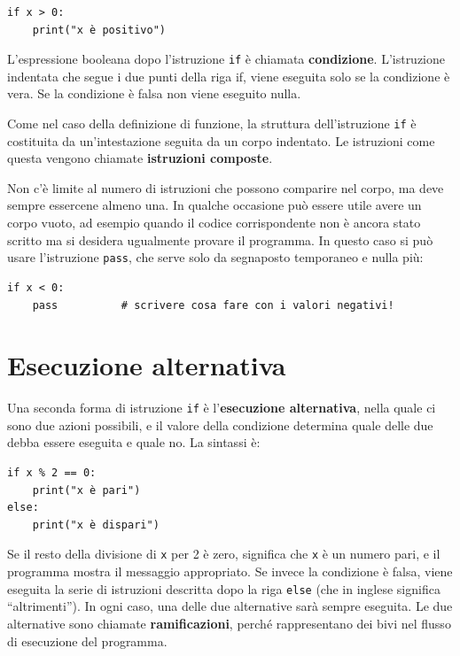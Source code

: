 \documentclass[10pt]{book}
\begin{document}
\begin{verbatim}
if x > 0:
    print("x è positivo")
\end{verbatim}
%
L'espressione booleana dopo l'istruzione {\tt if} è chiamata {\bf condizione}.  L'istruzione indentata che segue i due punti della riga if, viene eseguita solo se la condizione è vera. Se la condizione è falsa non viene eseguito nulla.

Come nel caso della definizione di funzione, la struttura dell'istruzione {\tt if} è costituita da un'intestazione seguita da un corpo indentato. Le istruzioni come questa vengono chiamate {\bf istruzioni composte}.

Non c'è limite al numero di istruzioni che possono comparire nel corpo, ma deve sempre essercene almeno una. In qualche occasione può essere utile avere un corpo vuoto, ad esempio quando il codice corrispondente non è ancora stato scritto ma si desidera ugualmente provare il programma. In questo caso si può   usare l'istruzione {\tt pass}, che serve solo da segnaposto temporaneo e nulla più:

\begin{verbatim}
if x < 0:
    pass          # scrivere cosa fare con i valori negativi!
\end{verbatim}
%

\section{Esecuzione alternativa}
\label{alternative.execution}

Una seconda forma di istruzione {\tt if} è l'{\bf esecuzione alternativa},
nella quale ci sono due azioni possibili, e il valore della condizione
determina quale delle due debba essere eseguita e quale no. La sintassi è:

\begin{verbatim}
if x % 2 == 0:
    print("x è pari")
else:
    print("x è dispari")
\end{verbatim}
%
Se il resto della divisione di {\tt x} per 2 è zero, significa che {\tt x} è un numero pari, e il programma mostra il messaggio appropriato. Se invece la condizione è falsa, viene eseguita la serie di istruzioni descritta dopo la riga {\tt else} (che in inglese significa ``altrimenti''). In ogni caso, una delle due alternative sarà sempre eseguita. Le due alternative sono chiamate {\bf ramificazioni}, perché rappresentano dei bivi nel flusso di esecuzione del programma.
\end{document}
